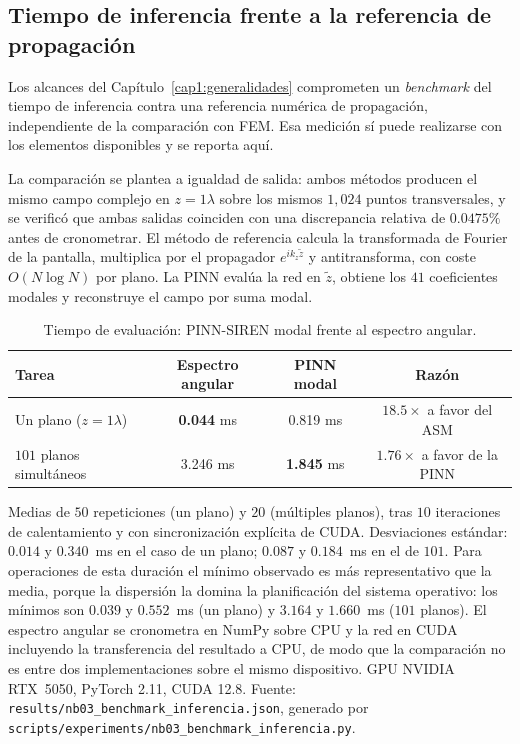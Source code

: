 \subsection{Tiempo de inferencia frente a la referencia de propagación}
\label{sec:nb03_inferencia}

Los alcances del Capítulo~\ref{cap1:generalidades} comprometen un
\textit{benchmark} del tiempo de inferencia contra una referencia numérica de
propagación, independiente de la comparación con FEM. Esa medición sí puede
realizarse con los elementos disponibles y se reporta aquí.

La comparación se plantea a igualdad de salida: ambos métodos producen el mismo
campo complejo en $z = 1\lambda$ sobre los mismos $1{,}024$ puntos
transversales, y se verificó que ambas salidas coinciden con una discrepancia
relativa de $0.0475\%$ antes de cronometrar. El método de referencia calcula la
transformada de Fourier de la pantalla, multiplica por el propagador
$e^{ik_z\tilde z}$ y antitransforma, con coste $O(N\log N)$ por plano. La
PINN evalúa la red en $\tilde z$, obtiene los $41$ coeficientes modales y
reconstruye el campo por suma modal.

\begin{table}[htbp]
\centering
\begin{threeparttable}
\caption{Tiempo de evaluación: PINN-SIREN modal frente al espectro angular.}
\label{tab:nb03_inferencia}
\begin{tabular}{lccc}
\toprule
Tarea & Espectro angular & PINN modal & Razón \\
\midrule
Un plano ($z = 1\lambda$)      & \textbf{0.044} ms & 0.819 ms & $18.5\times$ a favor del ASM \\
$101$ planos simultáneos              & 3.246 ms & \textbf{1.845} ms & $1.76\times$ a favor de la PINN \\
\bottomrule
\end{tabular}
\begin{tablenotes}\small
    \item Medias de $50$ repeticiones (un plano) y $20$ (múltiples planos),
    tras $10$ iteraciones de calentamiento y con sincronización explícita de
    CUDA. Desviaciones estándar: $0.014$ y $0.340$~ms en el caso de un
    plano; $0.087$ y $0.184$~ms en el de $101$. Para operaciones de esta
    duración el mínimo observado es más representativo que la media, porque la
    dispersión la domina la planificación del sistema operativo: los mínimos
    son $0.039$ y $0.552$~ms (un plano) y $3.164$ y $1.660$~ms
    ($101$ planos). El espectro angular se cronometra en NumPy sobre CPU y la
    red en CUDA incluyendo la transferencia del resultado a CPU, de modo que la
    comparación no es entre dos implementaciones sobre el mismo dispositivo.
    GPU NVIDIA RTX~5050, PyTorch 2.11, CUDA 12.8. Fuente:
    \texttt{results/nb03\_benchmark\_inferencia.json}, generado por
    \texttt{scripts/experiments/nb03\_benchmark\_inferencia.py}.
\end{tablenotes}
\end{threeparttable}
\end{table}

